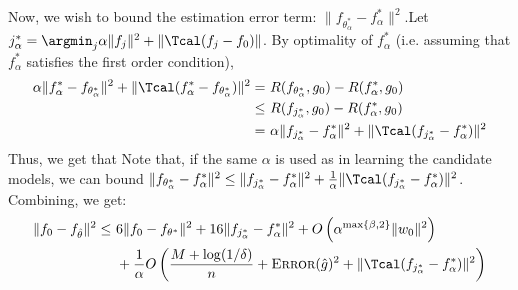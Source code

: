 \documentclass[12pt]{extarticle} %
\newcommand{\error}{\ensuremath{\textsc{Error}}}
\begin{document}

Now, we wish to bound the estimation error term: $\|f_{\theta_{\alpha}^*} - f_{\alpha}^*\|^2$.Let $j^*_\alpha=\argmin_j \alpha \|f_j\|^2 + \|\Tcal (f_j-f_0)\|$.
By optimality of $f_{\alpha}^*$ (i.e. assuming that $f_{\alpha}^*$ satisfies the first order condition),
\begin{align*}
    \alpha \|f_{\alpha}^*-f_{\theta_{\alpha}^*}\|^2 + \|\Tcal(f_{\alpha}^*-f_{\theta_{\alpha}^*})\|^2 =~& R(f_{\theta_{\alpha}^*},g_0) - R(f_{\alpha}^*,g_0)\\
    \leq~& R(f_{j^*_\alpha},g_0) - R(f_{\alpha}^*,g_0)\\
    =~&\alpha \|f_{j^*_\alpha}-f_{\alpha}^*\|^2 + \|\Tcal (f_{j^*_\alpha}-f_{\alpha}^*)\|^2\\
\end{align*}
Thus, we get that 
Note that, if the same $\alpha$ is used as in learning the candidate models, we can bound $\|f_{\theta_{\alpha}^*} - f_{\alpha}^*\|^2 \leq \|f_{j^*_\alpha} - f_{\alpha}^*\|^2 + \frac{1}{\alpha}\|\Tcal (f_{j^*_\alpha} - f_{\alpha}^*)\|^2$.
Combining, we get:
\begin{align*}
    \|f_0-f_{\hat{\theta}}\|^2 \leq~& 6\|f_0-f_{\theta^*}\|^2 + 16 \|f_{j^*_\alpha} - f_{\alpha}^*\|^2  + O\left(\alpha^{\max\{\beta,2\}}\|w_0\|^2\right)\\
    ~& +\frac{1}{\alpha} O\left(\frac{M+\log(1/\delta)}{n} + \error(\hat{g})^2 + \|\Tcal (f_{j^*_\alpha} - f_{\alpha}^*)\|^2\right)
\end{align*}
\end{document}
